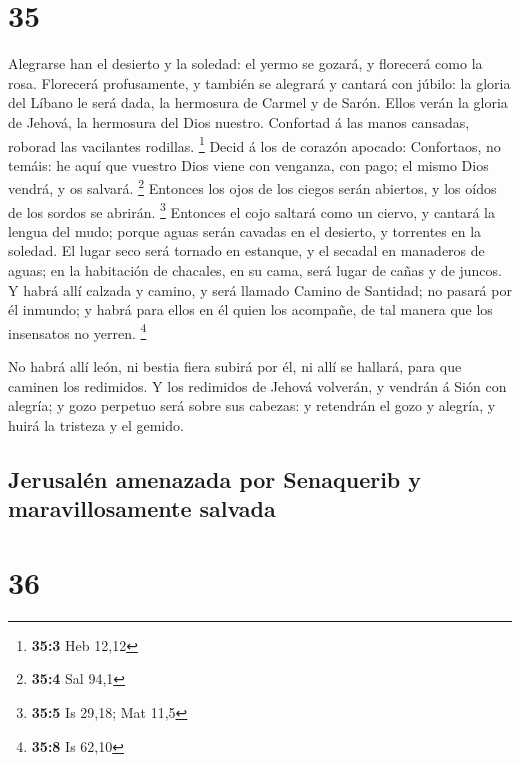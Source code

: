 \hypertarget{section-34}{%
\section{35}\label{section-34}}

 Alegrarse han el desierto y la soledad: el yermo se gozará,
y florecerá como la rosa.  Florecerá profusamente, y también
se alegrará y cantará con júbilo: la gloria del Líbano le será dada, la
hermosura de Carmel y de Sarón. Ellos verán la gloria de Jehová, la
hermosura del Dios nuestro.  Confortad á las manos cansadas,
roborad las vacilantes rodillas. \footnote{\textbf{35:3} Heb 12,12}
 Decid á los de corazón apocado: Confortaos, no temáis: he
aquí que vuestro Dios viene con venganza, con pago; el mismo Dios
vendrá, y os salvará. \footnote{\textbf{35:4} Sal 94,1} 
Entonces los ojos de los ciegos serán abiertos, y los oídos de los
sordos se abrirán. \footnote{\textbf{35:5} Is 29,18; Mat 11,5}
 Entonces el cojo saltará como un ciervo, y cantará la
lengua del mudo; porque aguas serán cavadas en el desierto, y torrentes
en la soledad.  El lugar seco será tornado en estanque, y el
secadal en manaderos de aguas; en la habitación de chacales, en su cama,
será lugar de cañas y de juncos.  Y habrá allí calzada y
camino, y será llamado Camino de Santidad; no pasará por él inmundo; y
habrá para ellos en él quien los acompañe, de tal manera que los
insensatos no yerren. \footnote{\textbf{35:8} Is 62,10}

 No habrá allí león, ni bestia fiera subirá por él, ni allí
se hallará, para que caminen los redimidos.  Y los
redimidos de Jehová volverán, y vendrán á Sión con alegría; y gozo
perpetuo será sobre sus cabezas: y retendrán el gozo y alegría, y huirá
la tristeza y el gemido.

\hypertarget{jerusaluxe9n-amenazada-por-senaquerib-y-maravillosamente-salvada}{%
\subsection{Jerusalén amenazada por Senaquerib y maravillosamente
salvada}\label{jerusaluxe9n-amenazada-por-senaquerib-y-maravillosamente-salvada}}

\hypertarget{section-35}{%
\section{36}\label{section-35}}

